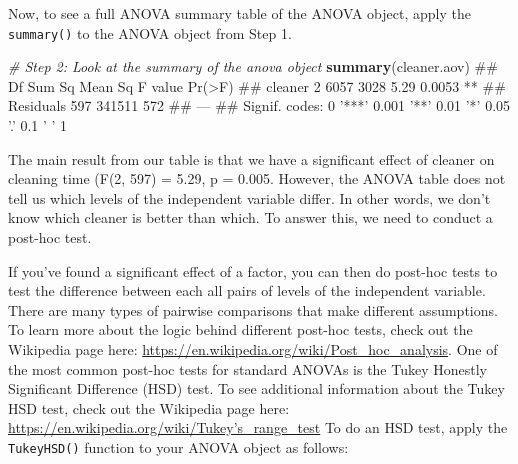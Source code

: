 \documentclass[]{book}
\newenvironment{Shaded}{\begin{snugshade}}{\end{snugshade}}
\newcommand{\KeywordTok}[1]{\textcolor[rgb]{0.13,0.29,0.53}{\textbf{#1}}}
\newcommand{\CommentTok}[1]{\textcolor[rgb]{0.56,0.35,0.01}{\textit{#1}}}
\newcommand{\NormalTok}[1]{#1}
\theoremstyle{definition}
\theoremstyle{definition}
\theoremstyle{remark}
\begin{document}
Now, to see a full ANOVA summary table of the ANOVA object, apply the
\texttt{summary()} to the ANOVA object from Step 1.

\begin{Shaded}
\begin{Highlighting}[]
\CommentTok{# Step 2: Look at the summary of the anova object}
\KeywordTok{summary}\NormalTok{(cleaner.aov)}
\NormalTok{##              Df Sum Sq Mean Sq F value Pr(>F)   }
\NormalTok{## cleaner       2   6057    3028    5.29 0.0053 **}
\NormalTok{## Residuals   597 341511     572                  }
\NormalTok{## ---}
\NormalTok{## Signif. codes:  0 '***' 0.001 '**' 0.01 '*' 0.05 '.' 0.1 ' ' 1}
\end{Highlighting}
\end{Shaded}

The main result from our table is that we have a significant effect of
cleaner on cleaning time (F(2, 597) = 5.29, p = 0.005. However, the
ANOVA table does not tell us which levels of the independent variable
differ. In other words, we don't know which cleaner is better than
which. To answer this, we need to conduct a post-hoc test.

If you've found a significant effect of a factor, you can then do
post-hoc tests to test the difference between each all pairs of levels
of the independent variable. There are many types of pairwise
comparisons that make different assumptions. To learn more about the
logic behind different post-hoc tests, check out the Wikipedia page
here: \url{https://en.wikipedia.org/wiki/Post_hoc_analysis}. One of the
most common post-hoc tests for standard ANOVAs is the Tukey Honestly
Significant Difference (HSD) test. To see additional information about
the Tukey HSD test, check out the Wikipedia page here:
\href{https://en.wikipedia.org/wiki/Tukey's_range_test}{https://en.wikipedia.org/wiki/Tukey's\_range\_test}
To do an HSD test, apply the \texttt{TukeyHSD()} function to your ANOVA
object as follows:

\begin{Shaded}
\end{Shaded}
\end{document}
